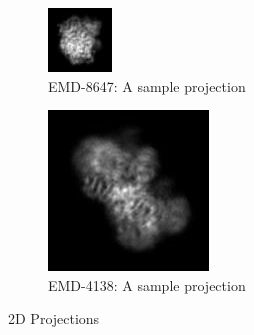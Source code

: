 \documentclass{report}
\begin{document}
\begin{figure}[h]
\centering
\begin{subfigure}{.5\textwidth}
\centering
\includegraphics[width=0.8\linewidth]{Emd_8647_proj1.jpg}
\captionsetup{justification=centering}
\caption{ EMD-8647: A sample projection }
\label{subfg:emd_8647_proj1}
\end{subfigure} 
\begin{subfigure}{.48\textwidth}
\centering
\includegraphics[width=0.8\linewidth]{Emd_4138_proj_1.jpg}
\captionsetup{justification=centering}
\caption{ EMD-4138: A sample projection}
\label{subfg:emd_4138_proj1}
\end{subfigure}
\caption{2D Projections}
\label{fig:Emdb-2D-projections}
\end{figure}
\end{document}
